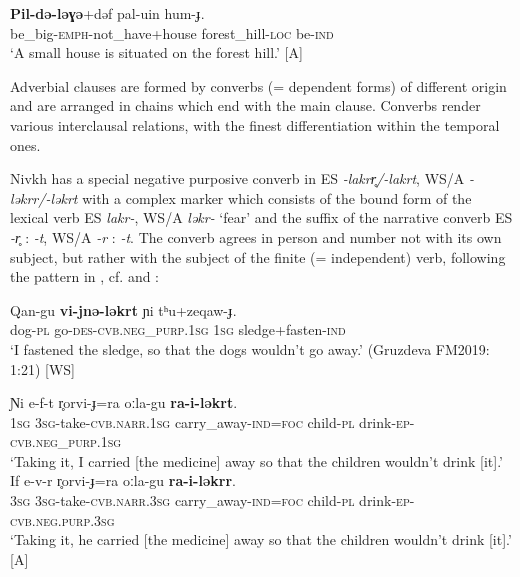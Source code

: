 \documentclass[output=paper,colorlinks,citecolor=brown]{langscibook}
\begin{document}
\ea\label{ex:niv:154}
    \gll \textbf{Pil-də{}-ləɣə}+dəf pal-uin hum-ɟ. \\ 
         be\_big-\textsc{emph}{}-not\_have+house forest\_hill-\textsc{loc} be-\textsc{ind} \\
    \glt ‘A small house is situated on the forest hill.’ \citep[160]{Panfilov1965} [A]
\z 

Adverbial clauses are formed by converbs (= dependent forms) of different origin and are arranged in chains which end with the main clause. Converbs render various interclausal relations, with the finest differentiation within the temporal ones.

Nivkh has a special negative purposive converb in ES \textit{-lakrr̥/-lakrt}, WS/A \textit{-ləkrr/-ləkrt} with a complex marker which consists of the bound form of the lexical verb ES \textit{lakr-}, WS/A \textit{ləkr-} ‘fear’ and the suffix of the narrative converb ES \textit{-r̥ }: \textit{-t}, WS/A \textit{-r }: \textit{-t}. The converb agrees in person and number not with its own subject, but rather with the subject of the finite (= independent) verb, following the pattern in , cf.  and :

\ea\label{ex:niv:155}
    \gll Qan-gu \textbf{vi-jnə{}-ləkrt} ɲi tʰu+zeqaw-ɟ. \\ 
         dog-\textsc{pl} go-\textsc{des-cvb.neg\_purp.1sg} \textsc{1sg} sledge+fasten-\textsc{ind} \\
    \glt ‘I fastened the sledge, so that the dogs wouldn’t go away.’ (Gruzdeva FM2019: 1:21) [WS]
\z 

\ea\label{ex:niv:156}
    \ea\label{ex:niv:156a}
        \gll Ɲi e-f-t r̥orvi-ɟ=ra oːla-gu \textbf{ra-i-ləkrt}. \\ 
             \textsc{1sg} \textsc{3sg-}take\textsc{{}-cvb.narr.1sg} carry\_away\textsc{{}-ind=foc} child-\textsc{pl} drink-\textsc{ep}{}-\textsc{cvb.neg\_purp.1sg} \\
        \glt ‘Taking it, I carried [the medicine] away so that the children wouldn’t drink [it].’
    \ex\label{ex:niv:156b}
        \gll If e-v-r r̥orvi-ɟ=ra oːla-gu \textbf{ra-i-ləkrr}. \\
             \textsc{3sg} \textsc{3sg-}take\textsc{{}-cvb.narr.3sg} carry\_away\textsc{{}-ind=foc} child-\textsc{pl} drink-\textsc{ep-cvb.neg.purp.3sg} \\
        \glt ‘Taking it, he carried [the medicine] away so that the children wouldn’t drink [it].’ \citep[321]{Kreinovich1979} [A]
    \z
\z 
\end{document}
